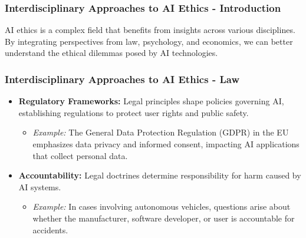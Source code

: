 \documentclass[aspectratio=169]{beamer}
\begin{document}
\begin{frame}[fragile]
  \frametitle{Interdisciplinary Approaches to AI Ethics - Introduction}
  AI ethics is a complex field that benefits from insights across various disciplines. By integrating perspectives from law, psychology, and economics, we can better understand the ethical dilemmas posed by AI technologies.
\end{frame}

\begin{frame}[fragile]
  \frametitle{Interdisciplinary Approaches to AI Ethics - Law}
  \begin{itemize}
    \item \textbf{Regulatory Frameworks:} Legal principles shape policies governing AI, establishing regulations to protect user rights and public safety.
      \begin{itemize}
        \item \textit{Example:} The General Data Protection Regulation (GDPR) in the EU emphasizes data privacy and informed consent, impacting AI applications that collect personal data.
      \end{itemize}
    \item \textbf{Accountability:} Legal doctrines determine responsibility for harm caused by AI systems.
      \begin{itemize}
        \item \textit{Example:} In cases involving autonomous vehicles, questions arise about whether the manufacturer, software developer, or user is accountable for accidents.
      \end{itemize}
  \end{itemize}
\end{frame}
\end{document}
